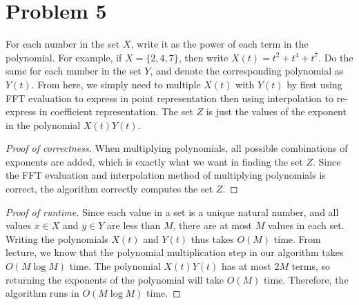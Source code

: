 \documentclass{article}
\begin{document}
\pagebreak

\section*{Problem 5}
For each number in the set $X$, write it as the power of each term in the polynomial. For example, if $X=\{2,4,7\}$, then write $X(t) = t^2 + t^4 + t^7$. Do the same for each number in the set $Y$, and denote the corresponding polynomial as $Y(t)$. From here, we simply need to multiple $X(t)$ with $Y(t)$ by first using FFT evaluation to express in point representation then using interpolation to re-express in coefficient representation. The set $Z$ is just the values of the exponent in the polynomial $X(t)Y(t)$.

\begin{proof}[Proof of correctness]
When multiplying polynomials, all possible combinations of exponents are added, which is exactly what we want in finding the set $Z$. Since the FFT evaluation and interpolation method of multiplying polynomials is correct, the algorithm correctly computes the set $Z$.
\end{proof}

\begin{proof}[Proof of runtime]
Since each value in a set is a unique natural number, and all values $x\in X$ and $y\in Y$ are less than $M$, there are at most $M$ values in each set. Writing the polynomials $X(t)$ and $Y(t)$ thus takes $O(M)$ time. From lecture, we know that the polynomial multiplication step in our algorithm takes $O(M \log M)$ time. The polynomial $X(t)Y(t)$ has at most $2M$ terms, so returning the exponents of the polynomial will take $O(M)$ time. Therefore, the algorithm runs in $O(M \log M)$ time.
\end{proof}
\end{document}
